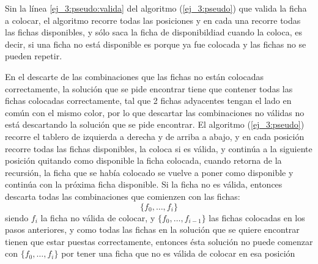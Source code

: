 Sin la l\'inea \ref{ej_3:pseudo:valida} del algoritmo (\ref{ej_3:pseudo}) que valida la ficha a colocar, el algoritmo recorre todas las posiciones y en cada una recorre todas las fichas disponibles, y s\'olo saca la ficha de disponibildiad cuando la coloca, es decir, si una ficha no est\'a disponible es porque ya fue colocada y las fichas no se pueden repetir.

En el descarte de las combinaciones que las fichas no est\'an colocadas correctamente, la soluci\'on que se pide encontrar tiene que contener todas las fichas colocadas correctamente, tal que 2 fichas adyacentes tengan el lado en com\'un con el mismo color, por lo que descartar las combinaciones no v\'alidas no est\'a descartando la soluci\'on que se pide encontrar.
El algoritmo (\ref{ej_3:pseudo}) recorre el tablero de izquierda a derecha y de arriba a abajo, y en cada posici\'on recorre todas las fichas disponibles, la coloca si es v\'alida, y contin\'ua a la siguiente posici\'on quitando como disponible la ficha colocada, cuando retorna de la recursi\'on, la ficha que se hab\'ia colocado se vuelve a poner como disponible y contin\'ua con la pr\'oxima ficha disponible. Si la ficha no es v\'alida, entonces descarta todas las combinaciones que comienzen con las fichas:
\begin{equation}
	\{f_0,\dotsc,f_i\}
\end{equation}
siendo $f_i$ la ficha no v\'alida de colocar, y $\{f_0,\dotsc,f_{i-1}\}$ las fichas colocadas en los pasos anteriores, y como todas las fichas en la soluci\'on que se quiere encontrar tienen que estar puestas correctamente, entonces \'esta soluci\'on no puede comenzar con $\{f_0,\dotsc,f_i\}$ por tener una ficha que no es v\'alida de colocar en esa posici\'on

